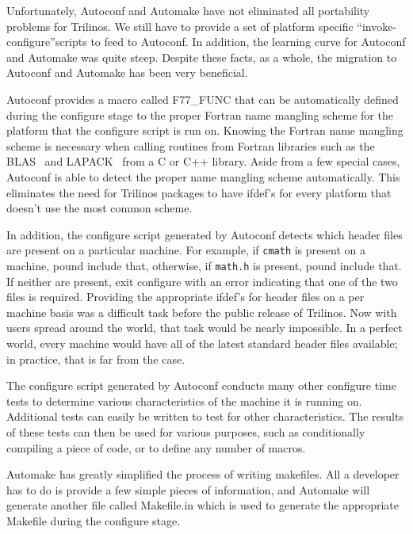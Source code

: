 \documentclass[12pt,relax]{article}
\newcommand{\InlineDirectory}[1]{
  {\hspace{0.01 in}} {\tt #1} {\hspace{0.01 in}}}
\begin{document}
Unfortunately, Autoconf and Automake have not eliminated all portability 
problems for Trilinos.  We still have to provide a set of platform specific
``invoke-configure''scripts to feed to Autoconf.  In addition, the learning 
curve for Autoconf and Automake was quite steep.  Despite these facts, 
as a whole, the migration to Autoconf and Automake has been very 
beneficial.  

Autoconf provides a macro called F77\_FUNC that can be 
automatically defined during the configure stage to the proper Fortran
name mangling scheme for the platform that the configure script is run on.  
Knowing the Fortran name mangling scheme is necessary when calling routines 
from Fortran libraries such as the BLAS~\cite{BLAS1,BLAS2,BLAS3} and 
LAPACK~\cite{lapack} from a C or C++ library.  Aside from a few special cases, 
Autoconf is able to detect the proper name mangling scheme automatically.  
This eliminates the need for Trilinos packages to have ifdef's for every 
platform that doesn't use the most common scheme.

In addition, the configure script generated by Autoconf detects which 
header files are present on a particular 
machine.  For example, if \InlineDirectory{cmath} is present on a machine, 
pound include that, otherwise, if \InlineDirectory{math.h} is present, pound 
include that.  If neither are present, exit configure with an error indicating 
that one of the two files is required.  Providing the appropriate ifdef's 
for header files on a per machine basis was a difficult task before the 
public release of Trilinos.  Now with users spread around the world, that 
task would be nearly impossible.  In a perfect world, every machine would 
have all of the latest standard header files available; in practice, that 
is far from the case.

The configure script generated by Autoconf conducts many other configure 
time tests to determine various 
characteristics of the machine it is running on.  Additional tests can 
easily be written to test for other characteristics.  The results of these 
tests can then be used for various purposes, such as conditionally compiling 
a piece of code, or to define any number of macros.

Automake has greatly simplified the process of writing makefiles.  All a 
developer has to do is provide a few simple pieces of information, and 
Automake will generate another file called Makefile.in which is used to 
generate the appropriate Makefile during the configure stage.
\end{document}
